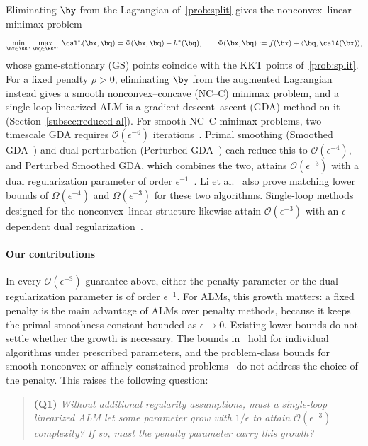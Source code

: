 Eliminating $\by$ from the Lagrangian of~\eqref{prob:split} gives the
nonconvex--linear minimax problem
\begin{equation}\label{eq:ncl}
  \min_{\bx\in\RR^n}\max_{\bq\in\RR^m}\;
  \calL(\bx,\bq) = \Phi(\bx,\bq)-h^*(\bq), \qquad
  \Phi(\bx,\bq):=f(\bx)+\langle\bq,\calA(\bx)\rangle,
\end{equation}
whose game-stationary (GS) points coincide with the KKT points
of~\eqref{prob:split}. For a fixed penalty $\rho>0$, eliminating $\by$ from the
augmented Lagrangian instead gives a smooth nonconvex--concave (NC--C) minimax
problem, and a single-loop linearized ALM is a gradient descent--ascent (GDA)
method on it (Section~\ref{subsec:reduced-al}). For smooth NC--C minimax
problems, two-timescale GDA requires $\mathcal O(\epsilon^{-6})$
iterations~\cite{lin2020gradient}. Primal smoothing (Smoothed
GDA~\cite{zhang2020smoothed}) and dual perturbation (Perturbed
GDA~\cite{lu2020hybrid,xu2023unified}) each reduce this to
$\mathcal O(\epsilon^{-4})$, and Perturbed Smoothed GDA, which combines the two,
attains $\mathcal O(\epsilon^{-3})$ with a dual regularization parameter of
order $\epsilon^{-1}$~\cite{li2026smoothing}. Li et al.~\cite{li2026smoothing}
also prove matching lower bounds of $\Omega(\epsilon^{-4})$ and
$\Omega(\epsilon^{-3})$ for these two algorithms. Single-loop methods designed
for the nonconvex--linear structure likewise attain
$\mathcal O(\epsilon^{-3})$ with an $\epsilon$-dependent dual
regularization~\cite{pan2021efficient,he2024approximation,xu2026rada}.

\paragraph{Our contributions}
In every $\mathcal O(\epsilon^{-3})$ guarantee above, either the penalty
parameter or the dual regularization parameter is of order $\epsilon^{-1}$.
For ALMs, this growth matters: a fixed penalty is the main advantage of ALMs
over penalty methods, because it keeps the primal smoothness constant bounded
as $\epsilon\to0$. Existing lower bounds do not settle whether the growth is
necessary. The bounds in~\cite{mahdavinia2022tight,li2026smoothing} hold for
individual algorithms under prescribed parameters, and the problem-class
bounds for smooth nonconvex or affinely constrained
problems~\cite{carmon2020lower,liu2026lower} do not address the choice of the
penalty. This raises the following question:
\begin{quote}
  \textbf{(Q1)}
  \emph{Without additional regularity assumptions, must a single-loop
  linearized ALM let some parameter grow with $1/\epsilon$ to attain
  $\mathcal O(\epsilon^{-3})$ complexity? If so, must the penalty parameter
  carry this growth?}
\end{quote}

